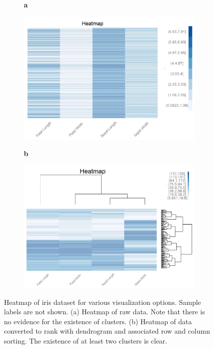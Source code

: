 \documentclass{article}
\begin{document}
\begin{figure}[t!]
	\centering
	\begin{subfigure}[t]{0.01\textwidth}
		\textbf{a}
	\end{subfigure}
	\begin{subfigure}[t]{0.46\textwidth}
		\includegraphics[width=\textwidth,valign=t]{Figures/Iris/HeatmapRawnodendro.png}
		\subcaption{}
		\label{fig:FigHeatmapRawnodendro}
	\end{subfigure}\hfill
	\begin{subfigure}[t]{0.01\textwidth}
		\textbf{b}
	\end{subfigure}
	\begin{subfigure}[t]{0.46\textwidth}
		\includegraphics[width=\textwidth,valign=t]{Figures/Iris/HeatmapRanksDendro.png}
		\subcaption{}
		\label{fig:FigHeatmapRanksdendro}
	\end{subfigure}
	\vspace{-1.5\baselineskip}
	\caption{Heatmap of iris dataset for various visualization options. Sample labels are not shown. (a) Heatmap of raw data. Note that there is no evidence for the existence of clusters. (b) Heatmap of data converted to rank with dendrogram and associated row and column sorting. The existence of at least two clusters is clear.}
	\label{fig:FigHeatmap}
\end{figure}
\end{document}
